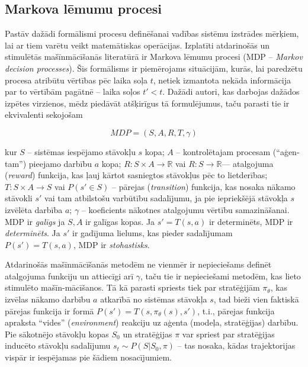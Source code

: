 \documentclass[12pt, a4paper]{article}
\numberwithin{equation}{section} %
\begin{document}
\subsection{Markova lēmumu procesi}

Pastāv dažādi formālismi procesu definēšanai vadības sistēmu izstrādes mērķiem, lai ar tiem varētu veikt matemātiskas operācijas. Izplatīti atdarinošās un stimulētās mašīnmācīšanās literatūrā ir Markova lēmumu procesi (MDP -- \textit{Markov decision processes}). Šis formālisms ir piemērojams  situācijām, kurās, lai paredzētu procesa atribūtu vērtības pēc laika soļa $t$, netiek izmantota nekāda informācija par to vērtībām pagātnē -- laika soļos $t' < t$. Dažādi autori, kas darbojas dažādos izpētes virzienos, mēdz piedāvāt atšķirīgus tā formulējumus, taču parasti tie ir ekvivalenti sekojošam \cite{attia2018global}

\begin{equation} 
    MDP = (S,A,R,T, \gamma)
\end{equation}

kur $S$ -- sistēmas iespējamo stāvokļu $s$ kopa; $A$ -- kontrolētajam procesam (``aģen-tam'') pieejamo darbību $a$ kopa; $R: S \times A \rightarrow \mathbb{R}$ vai $R: S \rightarrow \mathbb{R}$--- atalgojuma (\textit{reward}) funkcija, kas ļauj kārtot sasniegtos stāvokļus pēc to lietderības; $T: S \times A \rightarrow S$ vai $P(s' \in S)$ -- pārejas (\textit{transition}) funkcija, kas nosaka nākamo stāvokli $s'$ vai tam atbilstošu varbūtību sadalījumu, ja pie iepriekšējā stāvokļa $s$ izvēlēta darbība $a$; $\gamma$ -- koeficients nākotnes atalgojumu vērtību samazināšanai. MDP ir \textit{galīgs} ja $S,A$ ir galīgas kopas. Ja $s' = T(s,a)$ ir determinēts, MDP ir \textit{determinēts}. Ja $s'$ ir gadījuma lielums, kas pieder sadalījumam $P(s')=T(s,a)$, MDP ir \textit{stohastisks}.

Atdarinošās mašīnmācīšanās metodēm ne vienmēr ir nepieciešams definēt atalgojuma funkciju un attiecīgi arī $\gamma$, taču tie ir nepieciešami metodēm, kas lieto stimulēto mašīn-mācīšanos. Tā kā parasti spriests tiek par stratēģijām $\pi_{\theta}$, kas izvēlas nākamo darbību $a$ atkarībā no sistēmas stāvokļa $s$, tad bieži vien faktiskā pārejas funkcija ir formā $P(s') = T(s, \pi_{\theta}(s), s')$, t.i., pārejas funkcija apraksta ``vides'' (\textit{environment}) reakciju uz aģenta (modeļa, stratēģijas) darbību. Pie sākotnējo stāvokļu kopas $S_0$ un stratēģijas $\pi$ var spriest par stratēģijas inducēto stāvokļu sadalījumu $s_t \sim P(S \vert S_0, \pi)$ -- tas nosaka, kādas trajektorijas vispār ir iespējamas pie šādiem nosacījumiem. 
\end{document}

